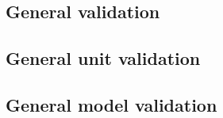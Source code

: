 \begin{sbmlenum}
\end{sbmlenum} \subsection*{General  validation} \begin{sbmlenum}


\end{sbmlenum} \subsection*{General unit validation} \begin{sbmlenum}


\begin{blockChanged}


\end{blockChanged}

\end{sbmlenum} \subsection*{General model validation} \begin{sbmlenum}


\end{sbmlenum} \subsection*{} \begin{sbmlenum}

\begin{blockChanged}


\end{blockChanged}


\end{sbmlenum}
